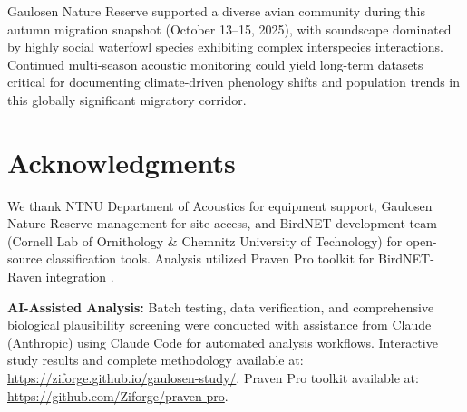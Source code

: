 \documentclass[twocolumn]{article}
\begin{document}
Gaulosen Nature Reserve supported a diverse avian community during this autumn migration snapshot (October 13--15, 2025), with soundscape dominated by highly social waterfowl species exhibiting complex interspecies interactions. Continued multi-season acoustic monitoring could yield long-term datasets critical for documenting climate-driven phenology shifts and population trends in this globally significant migratory corridor.

\section*{Acknowledgments}

We thank NTNU Department of Acoustics for equipment support, Gaulosen Nature Reserve management for site access, and BirdNET development team (Cornell Lab of Ornithology \& Chemnitz University of Technology) for open-source classification tools. Analysis utilized Praven Pro toolkit for BirdNET-Raven integration \citep{Redpath2025}.

\textbf{AI-Assisted Analysis:} Batch testing, data verification, and comprehensive biological plausibility screening were conducted with assistance from Claude (Anthropic) using Claude Code for automated analysis workflows. Interactive study results and complete methodology available at: \url{https://ziforge.github.io/gaulosen-study/}. Praven Pro toolkit available at: \url{https://github.com/Ziforge/praven-pro}.
\end{document}
